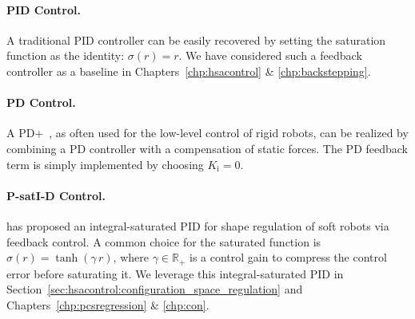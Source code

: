 \paragraph{PID Control.} A traditional PID controller can be easily recovered by setting the saturation function as the identity: $\sigma(r) = r$. We have considered such a feedback controller as a baseline in Chapters~\ref{chp:hsacontrol} \& \ref{chp:backstepping}.

\paragraph{PD Control.} A PD+~\citep{kelly1997pd}, as often used for the low-level control of rigid robots, can be realized by combining a PD controller with a compensation of static forces. The PD feedback term is simply implemented by choosing $K_\mathrm{i} = 0$.

\paragraph{P-satI-D Control.} \citet{pustina2022p} has proposed an integral-saturated PID for shape regulation of soft robots via feedback control. A common choice for the saturated function is $\sigma(r) = \tanh(\gamma \, r)$, where $\gamma \in \mathbb{R}_+$ is a control gain to compress the control error before saturating it. We leverage this integral-saturated PID in Section~\ref{sec:hsacontrol:configuration_space_regulation} and Chapters~\ref{chp:pcsregression} \& \ref{chp:con}.

